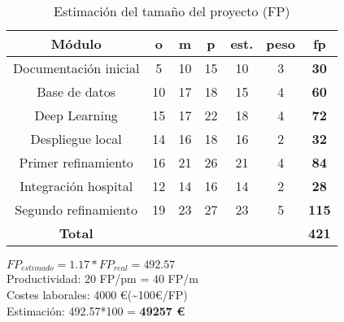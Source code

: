 \begin{table}[H]
	\begin{center}
		\begin{tabular}{|c||c|c|c|c|c|c|}
			\hline 
			Módulo & o & m & p & est. & peso & \textbf{fp} \\
			\hline \hline
			Documentación inicial & 5 & 10 & 15 & 10 & 3 & \textbf{30}  \\ \hline
			Base de datos & 10 & 17 & 18 & 15 & 4 & \textbf{60}  \\ \hline
			Deep Learning & 15 & 17 & 22 & 18 & 4 & \textbf{72}  \\ \hline
			Despliegue local & 14 & 16 & 18 & 16 & 2 & \textbf{32}  \\ \hline
			Primer refinamiento & 16 & 21 & 26 & 21 & 4 & \textbf{84}  \\ \hline
			Integración hospital & 12 & 14 & 16 & 14 & 2 & \textbf{28}  \\ \hline
			Segundo refinamiento & 19 & 23 & 27 & 23 & 5 & \textbf{115}  \\ \hline
			\textbf{Total} & & & & & & \textbf{421}  \\ \hline
		\end{tabular}
		\caption{Estimación del tamaño del proyecto (FP)}
		\label{tabla:FP}
	\end{center}
\end{table}
%
%

$FP_{estimado} = 1.17 * FP_{real} = 492.57$ \\
Productividad: 20 FP/pm = 40 FP/m \\
Costes laborales: 4000 \euro (\textasciitilde{}100\euro/FP) \\
Estimación: 492.57*100 = \textbf{49257 \euro} 

       
